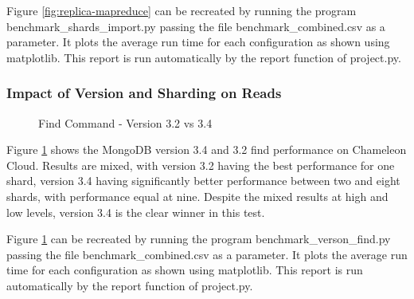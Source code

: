 \documentclass[9pt,twocolumn,twoside]{../../styles/osajnl}
\begin{document}
Figure \ref{fig:replica-mapreduce} can be recreated by running the program benchmark\_shards\_import.py passing the file benchmark\_combined.csv as a parameter.  It plots the average run time for each configuration as shown using matplotlib.  This report is run automatically by the report function of project.py.





\subsubsection{Impact of Version and Sharding on Reads}


\begin{figure}[htbp]
\centering
{}
\caption{Find Command - Version 3.2 vs 3.4}
\label{fig:version-find}
\end{figure}

Figure \ref{fig:version-find} shows the MongoDB version 3.4 and 3.2 find performance on Chameleon Cloud.  Results are mixed, with version 3.2 having the best performance for one shard, version 3.4 having significantly better performance between two and eight shards, with performance equal at nine.  Despite the mixed results at high and low levels, version 3.4 is the clear winner in this test.


Figure \ref{fig:version-find} can be recreated by running the program benchmark\_verson\_find.py passing the file benchmark\_combined.csv as a parameter.  It plots the average run time for each configuration as shown using matplotlib.  This report is run automatically by the report function of project.py.
\end{document}
